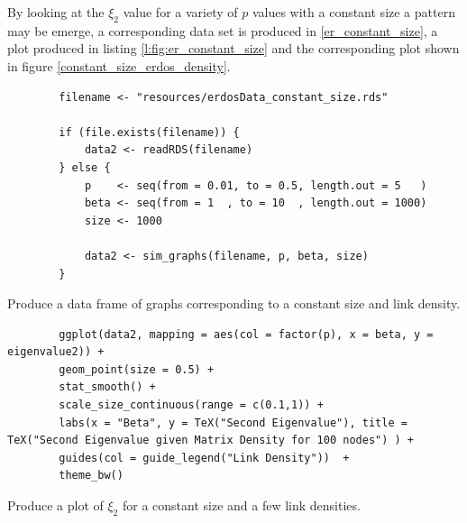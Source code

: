\documentclass[11pt, twoside]{report}
\begin{document}
By looking at the \(\xi_{2}\) value for a variety of \(p\) values with a
constant size a pattern may be emerge, a corresponding data set is produced in
\ref{er_constant_size}, a plot produced in listing \ref{l:fig:er_constant_size} and the
corresponding plot shown in figure \ref{constant_size_erdos_density}.

\begin{listing}[htbp]
    \begin{tcolorbox}
        \begin{verbatim}
        filename <- "resources/erdosData_constant_size.rds"

        if (file.exists(filename)) {
            data2 <- readRDS(filename)
        } else {
            p    <- seq(from = 0.01, to = 0.5, length.out = 5   )
            beta <- seq(from = 1  , to = 10  , length.out = 1000)
            size <- 1000

            data2 <- sim_graphs(filename, p, beta, size)
        }
        \end{verbatim}
    \end{tcolorbox}
\caption{\label{er_constant_size}Produce a data frame of graphs corresponding to a constant size and link density.}
\end{listing}

\begin{listing}[htbp]
    \begin{tcolorbox}
        \begin{verbatim}
        ggplot(data2, mapping = aes(col = factor(p), x = beta, y = eigenvalue2)) +
        geom_point(size = 0.5) +
        stat_smooth() +
        scale_size_continuous(range = c(0.1,1)) +
        labs(x = "Beta", y = TeX("Second Eigenvalue"), title = TeX("Second Eigenvalue given Matrix Density for 100 nodes") ) +
        guides(col = guide_legend("Link Density"))  +
        theme_bw()
        \end{verbatim}
    \end{tcolorbox}
\caption{\label{l:fig:er_constant_size}Produce a plot of \(\xi_{2}\) for a constant size and a few link densities.}
\end{listing}
\end{document}
